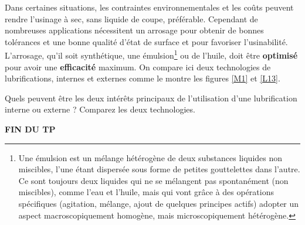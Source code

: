 \documentclass[12pt]{article}
\newcounter{exo}
\newenvironment{exo}{\stepcounter{exo}\vspace{0.5cm}{\bfseries Question \theexo\ :}}{\par\vspace{0.5cm}}
\begin{document}
Dans certaines situations, les contraintes environnementales et les coûts peuvent rendre l'usinage à sec, sans liquide de coupe, préférable. Cependant de nombreuses applications nécessitent un arrosage pour obtenir de bonnes tolérances et une bonne qualité d'état de surface et pour favoriser l'usinabilité. L'arrosage, qu'il soit synthétique, une émulsion\footnote{Une émulsion est un mélange hétérogène de deux substances liquides non miscibles, l'une étant dispersée sous forme de petites gouttelettes dans l'autre. Ce sont toujours deux liquides qui ne se mélangent pas spontanément (non miscibles), comme l’eau et l’huile, mais qui vont grâce à des opérations spécifiques (agitation, mélange, ajout de quelques principes actifs) adopter un aspect macroscopiquement homogène, mais microscopiquement hétérogène.} ou de l'huile, doit être \textbf{optimisé} pour avoir une \textbf{efficacité} maximum. On compare ici deux technologies de lubrifications, internes et externes comme le montre les figures \ref{M1} et \ref{L13}.


\begin{exo} Quels peuvent être les deux intérêts principaux de l'utilisation d'une lubrification interne ou externe ? Comparez les deux technologies.\end{exo}




\begin{center}
    \textbf{FIN DU TP}
\end{center}
\end{document}
